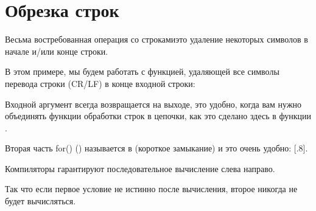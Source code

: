 \chapter{Обрезка строк}
\newcommand{\CRLF}{\ac{CR}/\ac{LF}}

Весьма востребованная операция со строками\EMDASH{}это удаление некоторых символов в начале и/или конце
строки.

В этом примере, мы будем работать с функцией, удаляющей все символы перевода строки 
(\CRLF{}) в конце входной строки:



Входной аргумент всегда возвращается на выходе, это удобно, когда вам нужно объединять
функции обработки строк в цепочки, как это сделано здесь в функции \main.

Вторая часть for() () называется в \CCpp {} 
(короткое замыкание) и это очень удобно: [.8].

Компиляторы \CCpp гарантируют последовательное вычисление слева направо.

Так что если первое условие не истинно после вычисления, второе никогда не будет
вычисляться.






